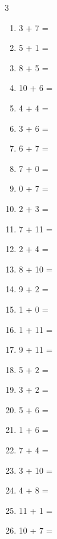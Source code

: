 \documentclass[a4paper, 11pt]{article}
\begin{document}
\begin{multicols}{3}
\begin{enumerate}
      \item 3 + 7 = \dotfill\bigskip
      \item 5 + 1 = \dotfill\bigskip
      \item 8 + 5 = \dotfill\bigskip
      \item 10 + 6 = \dotfill\bigskip
      \item 4 + 4 = \dotfill\bigskip
      \item 3 + 6 = \dotfill\bigskip
      \item 6 + 7 = \dotfill\bigskip
      \item 7 + 0 = \dotfill
      \item 0 + 7 = \dotfill\bigskip
      \item 2 + 3 = \dotfill\bigskip
      \item 7 + 11 = \dotfill\bigskip
      \item 2 + 4 = \dotfill\bigskip
      \item 8 + 10 = \dotfill\bigskip
      \item 9 + 2 = \dotfill\bigskip
      \item 1 + 0 = \dotfill\bigskip
      \item 1 + 11 = \dotfill\bigskip
      \item 9 + 11 = \dotfill\bigskip
      \item 5 + 2 = \dotfill\bigskip
      \item 3 + 2 = \dotfill\bigskip
      \item 5 + 6 = \dotfill\bigskip
      \item 1 + 6 = \dotfill\bigskip
      \item 7 + 4 = \dotfill\bigskip
      \item 3 + 10 = \dotfill\bigskip
      \item 4 + 8 = \dotfill\bigskip
      \item 11 + 1 = \dotfill\bigskip
      \item 10 + 7 = \dotfill
    \end{enumerate}
\end{multicols}
\end{document}
